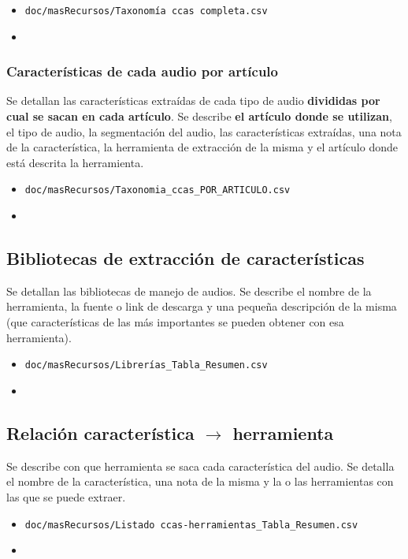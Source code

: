 \begin{itemize}
\item \texttt{doc/masRecursos/Taxonomía ccas completa.csv}
\item {}
\end{itemize}

\subsubsection{Características de cada audio por artículo}
Se detallan las características extraídas de cada tipo de audio \textbf{divididas por cual se sacan en cada artículo}. Se describe \textbf{el artículo donde se utilizan}, el tipo de audio, la segmentación del audio, las características extraídas, una nota de la característica, la herramienta de extracción de la misma y el artículo donde está descrita la herramienta.

\begin{itemize}
\item \texttt{doc/masRecursos/Taxonomia\_ccas\_POR\_ARTICULO.csv}
\item {}
\end{itemize}

\subsection{Bibliotecas de extracción de características}
Se detallan las bibliotecas de manejo de audios. Se describe el nombre de la herramienta, la fuente o link de descarga y una pequeña descripción de la misma (que características de las más importantes se pueden obtener con esa herramienta).
\begin{itemize}
\item \texttt{doc/masRecursos/Librerías\_Tabla\_Resumen.csv}
\item {}
\end{itemize}


\subsection{Relación característica $\rightarrow$ herramienta}
Se describe con que herramienta se saca cada característica del audio. Se detalla el nombre de la característica, una nota de la misma y la o las herramientas con las que se puede extraer.

\begin{itemize}
\item \texttt{doc/masRecursos/Listado ccas-herramientas\_Tabla\_Resumen.csv}
\item {}
\end{itemize}

    